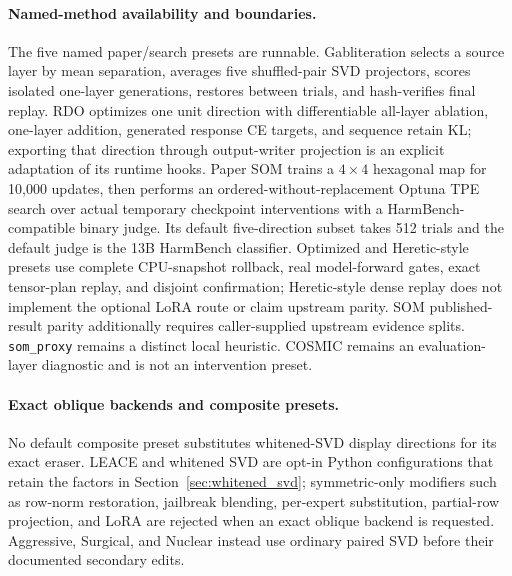 \documentclass[11pt]{article}
\begin{document}
\paragraph{Named-method availability and boundaries.}
The five named paper/search presets are runnable. Gabliteration selects a source layer by mean separation, averages five shuffled-pair SVD projectors, scores isolated one-layer generations, restores between trials, and hash-verifies final replay. RDO optimizes one unit direction with differentiable all-layer ablation, one-layer addition, generated response CE targets, and sequence retain KL; exporting that direction through output-writer projection is an explicit adaptation of its runtime hooks. Paper SOM trains a $4\times4$ hexagonal map for 10,000 updates, then performs an ordered-without-replacement Optuna TPE search over actual temporary checkpoint interventions with a HarmBench-compatible binary judge. Its default five-direction subset takes 512 trials and the default judge is the 13B HarmBench classifier. Optimized and Heretic-style presets use complete CPU-snapshot rollback, real model-forward gates, exact tensor-plan replay, and disjoint confirmation; Heretic-style dense replay does not implement the optional LoRA route or claim upstream parity. SOM published-result parity additionally requires caller-supplied upstream evidence splits. \texttt{som\_proxy} remains a distinct local heuristic. COSMIC remains an evaluation-layer diagnostic and is not an intervention preset.

\paragraph{Exact oblique backends and composite presets.}
No default composite preset substitutes whitened-SVD display directions for its exact eraser. LEACE and whitened SVD are opt-in Python configurations that retain the factors in Section~\ref{sec:whitened_svd}; symmetric-only modifiers such as row-norm restoration, jailbreak blending, per-expert substitution, partial-row projection, and LoRA are rejected when an exact oblique backend is requested. Aggressive, Surgical, and Nuclear instead use ordinary paired SVD before their documented secondary edits.
\end{document}
